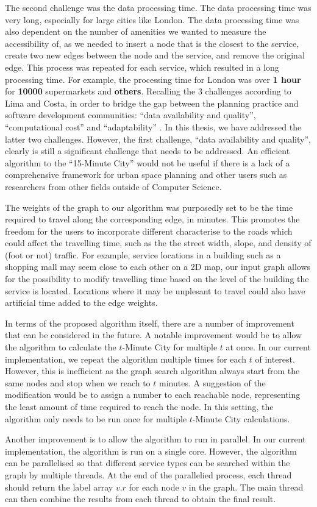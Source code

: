 The second challenge was the data processing time. The data processing time was very long, especially for large cities like London. The data processing time was also dependent on the number of amenities we wanted to measure the accessibility of, as we needed to insert a node that is the closest to the service, create two new edges between the node and the service, and remove the original edge. This process was repeated for each service, which resulted in a long processing time. For example, the processing time for London was over \textbf{1 hour} for \textbf{10000} supermarkets and \textbf{others}. Recalling the 3 challenges according to Lima and Costa, in order to bridge the gap between the planning practice and software development communities: ``data availability and quality'', ``computational cost'' and ``adaptability'' \cite{lima_quest_2023}. In this thesis, we have addressed the latter two challenges. However, the first challenge, ``data availability and quality'', clearly is still a significant challenge that needs to be addressed. An efficient algorithm to the ``15-Minute City'' would not be useful if there is a lack of a comprehensive framework for urban space planning and other users such as researchers from other fields outside of Computer Science.

The weights of the graph to our algorithm was purposedly set to be the time required to travel along the corresponding edge, in minutes. This promotes the freedom for the users to incorporate different characterise to the roads which could affect the travelling time, such as the the street width, slope, and density of (foot or not) traffic. For example, service locations in a building such as a shopping mall may seem close to each other on a 2D map, our input graph allows for the possibility to modify travelling time based on the level of the building the service is located. Locations where it may be unplesant to travel could also have artificial time added to the edge weights.

In terms of the proposed algorithm itself, there are a number of improvement that can be considered in the future. A notable improvement would be to allow the algorithm to calculate the $t$-Minute City for multiple $t$ at once. In our current implementation, we repeat the algorithm multiple times for each $t$ of interest. However, this is inefficient as the graph search algorithm always start from the same nodes and stop when we reach to $t$ minutes. A suggestion of the modification would be to assign a number to each reachable node, representing the least amount of time required to reach the node. In this setting, the algorithm only needs to be run once for multiple $t$-Minute City calculations.

Another improvement is to allow the algorithm to run in parallel. In our current implementation, the algorithm is run on a single core. However, the algorithm can be parallelised so that different service types can be searched within the graph by multiple threads. At the end of the parallelied process, each thread should return the label array $v.r$ for each node $v$ in the graph. The main thread can then combine the results from each thread to obtain the final result.